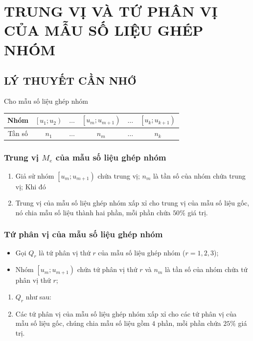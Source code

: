 \newpage
\section{TRUNG VỊ VÀ TỨ PHÂN VỊ CỦA MẪU SỐ LIỆU GHÉP NHÓM}

\subsection{LÝ THUYẾT CẦN NHỚ}
Cho mẫu số liệu ghép nhóm
\begin{center}
	\begin{tabular}{|c|c|c|c|c|c|}
		\hline
		Nhóm   & $\left[u_1;u_2 \right)$ & $\ldots$ & $\left[u_m;u_{m+1} \right)$ & $\ldots$ & $\left[u_k;u_{k+1} \right)$ \\
		\hline
		Tần số & $n_1$                   & $\ldots$ & $n_m$                       & $\ldots$ & $n_k$                       \\
		\hline
	\end{tabular}
\end{center}

\subsubsection{Trung vị $M_e$ của mẫu số liệu ghép nhóm}
\begin{enumerate}[\iconMT]
	\item {} Giả sử nhóm $ \left[ u_m ; u_{m+1}\right) $ chứa trung vị; $ n_m $ là tần số của nhóm chứa trung vị;
	      Khi đó 
	\item {} Trung vị của mẫu số liệu ghép nhóm xấp xỉ cho trung vị của mẫu số liệu gốc, nó chia mẫu số liệu thành hai phần, mỗi phần chứa $50\%$ giá trị.
\end{enumerate}

\subsubsection{Tứ phân vị của mẫu số liệu ghép nhóm}
\begin{itemize}
	\item Gọi $Q_r$ là tứ phân vị thứ $r$ của mẫu số liệu ghép nhóm ($r=1,2,3$);
	\item Nhóm $ \left[ u_m ; u_{m+1}\right) $  chứa tứ phân vị thứ $r$ và $ n_m $ là tần số của nhóm chứa tứ phân vị thứ $r$;
\end{itemize}
\begin{enumerate}[\iconMT]
	\item {} $Q_r$ như sau:
	\item {} Các tứ phân vị của mẫu số liệu ghép nhóm xấp xỉ cho các tứ phân vị của mẫu số liệu gốc, chúng chia mẫu số liệu gồm $4$ phần, mỗi phần chứa $25\%$ giá trị.
\end{enumerate}




